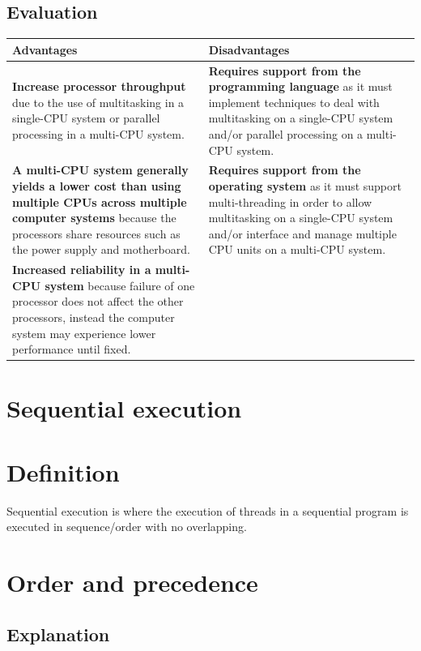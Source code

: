 \documentclass[a4paper]{systems-software}
\begin{document}
\subsection*{Evaluation}

\begin{longtabu} to \textwidth {|X[1,l]|X[1,l]|}
    \hline
    \textbf{Advantages} & \textbf{Disadvantages}
    \\ \hline
    \textbf{Increase processor throughput} due to the use of multitasking in a single-CPU system or parallel processing in a multi-CPU system.
    &
    \textbf{Requires support from the programming language} as it must implement techniques to deal with multitasking on a single-CPU system and/or parallel processing on a multi-CPU system.
    \\ \hline
  	\textbf{A multi-CPU system generally yields a lower cost than using multiple CPUs across multiple computer systems} because the processors share resources such as the power supply and motherboard.
    &
    \textbf{Requires support from the operating system} as it must support multi-threading in order to allow multitasking on a single-CPU system and/or interface and manage multiple CPU units on a multi-CPU system.
    \\ \hline
    \textbf{Increased reliability in a multi-CPU system} because failure of one processor does not affect the other processors, instead the computer system may experience lower performance until fixed.
    &
	\\ \hline
\end{longtabu}


\section{Sequential execution}

\section*{Definition}

Sequential execution is where the execution of threads in a sequential program is executed in sequence/order with no overlapping.


\section*{Order and precedence}

\subsection*{Explanation}
\end{document}
